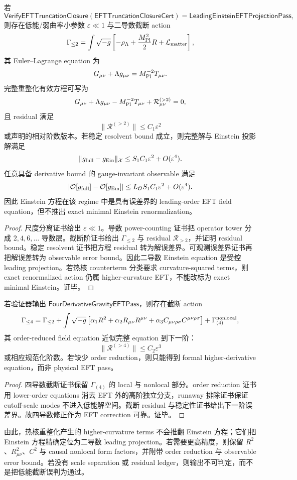 \begin{theorem}\label{thm:typed-address-biaxial-completion-eft-truncation-closure-soundness}
若
\[
\mathsf{VerifyEFTTruncationClosure}
(\mathsf{EFTTruncationClosureCert})
=
\mathsf{LeadingEinsteinEFTProjectionPass},
\]
则存在低能/弱曲率小参数 \(\varepsilon\ll1\) 与二导数截断 action
\[
\Gamma_{\le2}
=
\int\sqrt{-g}
\left[
-\rho_\Lambda
+
\frac{M_{\rm Pl}^2}{2}R
+
\mathcal L_{\rm matter}
\right],
\]
其 Euler--Lagrange equation 为
\[
G_{\mu\nu}+\Lambda g_{\mu\nu}=M_{\rm Pl}^{-2}T_{\mu\nu}.
\]
完整重整化有效方程可写为
\[
G_{\mu\nu}+\Lambda g_{\mu\nu}-M_{\rm Pl}^{-2}T_{\mu\nu}
+
\mathcal R_{\mu\nu}^{(>2)}
=0,
\]
且 residual 满足
\[
\|\mathcal R^{(>2)}\|\le C_1\varepsilon^2
\]
或声明的相对阶数版本。若稳定 resolvent bound 成立，则完整解与 Einstein 投影解满足
\[
\|g_{\rm full}-g_{\rm Ein}\|_{\mathcal X}
\le
S_1C_1\varepsilon^2+O(\varepsilon^4).
\]
任意具备 derivative bound 的 gauge-invariant observable 满足
\[
|\mathcal O[g_{\rm full}]-\mathcal O[g_{\rm Ein}]|
\le
L_{\mathcal O}S_1C_1\varepsilon^2+O(\varepsilon^4).
\]
因此 Einstein 方程在该 regime 中是具有误差界的 leading-order EFT field equation，但不推出 exact minimal Einstein renormalization。
\end{theorem}
\begin{proof}
尺度分离证书给出 \(\varepsilon\ll1\)。导数 power-counting 证书把 operator tower 分成 \(2,4,6,\ldots\) 导数层。截断阶证书给出 \(\Gamma_{\le2}\) 与 residual \(\mathcal R_{>2}\)，并证明 residual bound。稳定 resolvent 证书把方程 residual 转为解误差界。可观测误差界证书再把解误差转为 observable error bound。因此二导数 Einstein equation 是受控 leading projection。若热核 counterterm 分类要求 curvature-squared terms，则 exact renormalized action 仍属 higher-curvature EFT，不能改标为 exact minimal Einstein。证毕。
\end{proof}

\begin{theorem}\label{thm:typed-address-biaxial-completion-four-derivative-eft-correction-soundness}
若验证器输出 \(\mathsf{FourDerivativeGravityEFTPass}\)，则存在截断 action
\[
\Gamma_{\le4}
=
\Gamma_{\le2}
+
\int\sqrt{-g}
\left[
\alpha_1R^2+\alpha_2R_{\mu\nu}R^{\mu\nu}
+\alpha_3C_{\mu\nu\rho\sigma}C^{\mu\nu\rho\sigma}
\right]
+
\Gamma_{(4)}^{\rm nonlocal},
\]
其 order-reduced field equation 近似完整 equation 到下一阶：
\[
\|\mathcal R^{(>4)}\|\le C_2\varepsilon^3
\]
或相应规范化阶数。若缺少 order reduction，则只能得到 formal higher-derivative equation，而非 physical EFT pass。
\end{theorem}
\begin{proof}
四导数截断证书保留 \(\Gamma_{(4)}\) 的 local 与 nonlocal 部分。order reduction 证书用 lower-order equations 消去 EFT 外的高阶独立分支，runaway 排除证书保证 cutoff-scale modes 不进入低能解空间。截断 residual 与稳定性证书给出下一阶误差界。故四导数修正作为 EFT correction 可靠。证毕。
\end{proof}

由此，热核重整化产生的 higher-curvature terms 不会推翻 Einstein 方程；它们把 Einstein 方程精确定位为二导数 leading projection。若需要更高精度，则保留 \(R^2\)、\(R_{\mu\nu}^2\)、\(C^2\) 与 causal nonlocal form factors，并附带 order reduction 与 observable error bound。若没有 scale separation 或 residual ledger，则输出不可判定，而不是把低能截断误判为通过。
